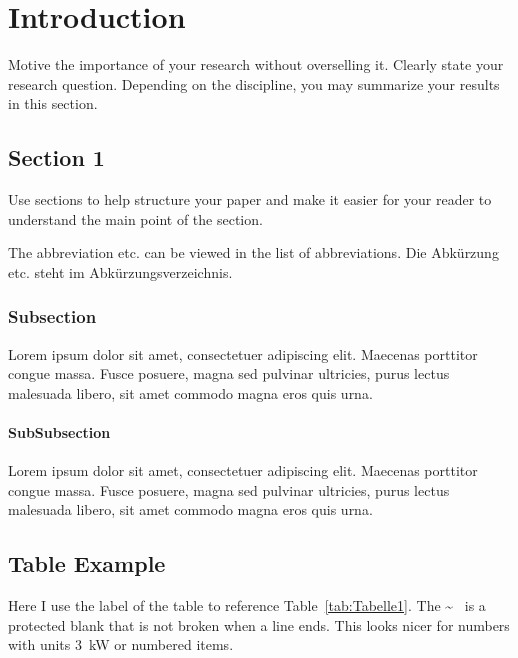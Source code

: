 \documentclass{thesisclass}
\begin{document}
\chapter{Introduction} 
Motive the importance of your research without overselling it. Clearly state your research question. Depending on the discipline, you may summarize your results in this section.



\section{Section 1}
\label{ch:Content1:sec:Section1}
Use sections to help structure your paper and make it easier for your reader to understand the main point of the section.

{The abbreviation etc.  can be viewed in the list of abbreviations.}
{Die Abkürzung etc. steht im Abkürzungsverzeichnis.}

\subsection{Subsection}
Lorem ipsum dolor sit amet, consectetuer adipiscing elit. Maecenas porttitor congue massa. Fusce posuere, magna sed pulvinar ultricies, purus lectus malesuada libero, sit amet commodo magna eros quis urna. 

\subsubsection{SubSubsection}
Lorem ipsum dolor sit amet, consectetuer adipiscing elit. Maecenas porttitor congue massa. Fusce posuere, magna sed pulvinar ultricies, purus lectus malesuada libero, sit amet commodo magna eros quis urna. 
\section{Table Example}
\label{ch:Content1:sec:Section2}

Here I use the label of the table to reference Table~\ref{tab:Tabelle1}. The \~~ is a protected blank that is not broken when a line ends. This looks nicer for numbers with units 3~kW or numbered items. 
\end{document}
